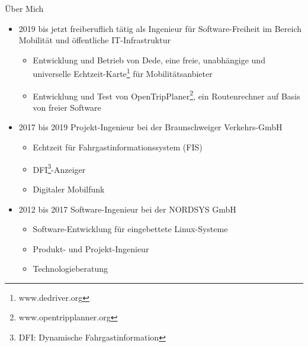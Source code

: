 
\begin{frame}{Über Mich}
  \begin{itemize}
  \item<1-1> 2019 bis jetzt freiberuflich tätig als Ingenieur für Software-Freiheit im Bereich Mobilität und öffentliche IT-Infrastruktur
    \begin{itemize}
    \item<1-1> Entwicklung und Betrieb von Dede, eine freie, unabhängige und universelle Echtzeit-Karte\footnote{www.dedriver.org} für Mobilitätsanbieter
    \item<1-1> Entwicklung und Test von OpenTripPlaner\footnote{www.opentripplanner.org}, ein Routenrechner auf Basis von freier Software
    \end{itemize}
  \item<2-2> 2017 bis 2019 Projekt-Ingenieur bei der Braunschweiger Verkehrs-GmbH
    \begin{itemize}
    \item<2-2> Echtzeit für Fahrgastinformationssystem (FIS)
    \item<2-2> DFI\footnote{DFI: Dynamische Fahrgastinformation}-Anzeiger
    \item<2-2> Digitaler Mobilfunk
    \end{itemize}
  \item<3-3> 2012 bis 2017 Software-Ingenieur bei der NORDSYS GmbH
    \begin{itemize}
    \item<3-3> Software-Entwicklung für eingebettete Linux-Systeme
    \item<3-3> Produkt- und Projekt-Ingenieur
    \item<3-3> Technologieberatung
    \end{itemize}
  \end{itemize}
\end{frame}
